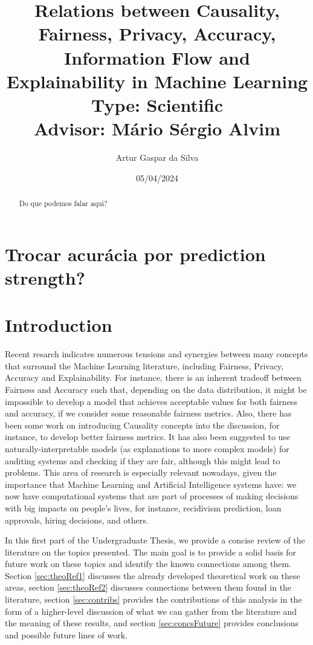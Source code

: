 \documentclass{article}
\title{Relations between Causality, Fairness, Privacy, Accuracy, Information Flow and Explainability in Machine Learning\large\\ Type: Scientific\\Advisor: Mário Sérgio Alvim}
\author{Artur Gaspar da Silva}
\date{05/04/2024}
\begin{document}
\maketitle

\begin{abstract}
    Do que podemos falar aqui?
\end{abstract}

\section{Trocar acurácia por prediction strength?}

\section{Introduction}

Recent resarch\cite{Sok}\cite{Reductions}\cite{Rachel}\cite{Awareness} indicates numerous tensions and synergies between many concepts that surround the Machine Learning literature, including Fairness, Privacy, Accuracy and Explainability. For instance, there is an inherent tradeoff between Fairness and Accuracy such that, depending on the data distribution, it might be impossible to develop a model that achieves acceptable values for both fairness and accuracy, if we consider some reasonable fairness metrics\cite{Carlos}. Also, there has been some work on introducing Causality concepts into the discussion, for instance, to develop better fairness metrics\cite{CausalFair}. It has also been suggested to use naturally-interpretable models (as explanations to more complex models) for auditing systems and checking if they are fair, although this might lead to problems\cite{ExplainAll}. This area of research is especially relevant nowadays, given the importance that Machine Learning and Artificial Intelligence systems have: we now have computational systems that are part of processes of making decisions with big impacts on people's lives, for instance, recidivism prediction\cite{Compass}, loan approvals\cite{Loans}, hiring decisions\cite{Jobs}, and others.

In this first part of the Undergraduate Thesis, we provide a concise review of the literature on the topics presented. The main goal is to provide a solid basis for future work on these topics and identify the known connections among them. Section \ref{sec:theoRef1} discusses the already developed theoretical work on these areas, section \ref{sec:theoRef2} discusses connections between them found in the literature, section \ref{sec:contribs} provides the contributions of this analysis in the form of a higher-level discussion of what we can gather from the literature and the meaning of these results, and section \ref{sec:concsFuture} provides conclusions and possible future lines of work. 
\end{document}
